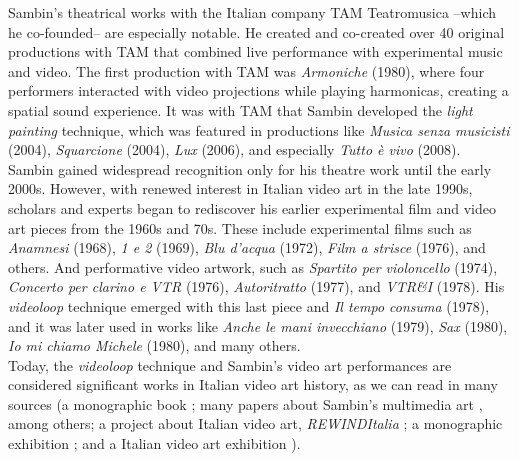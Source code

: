 Sambin’s theatrical works with the Italian company TAM Teatromusica –which he co-founded– are especially notable. He created and co-created over 40 original productions with TAM that combined live performance with experimental music and video. The first production with TAM was \textit{Armoniche} (1980), where four performers interacted with video projections while playing harmonicas, creating a spatial sound experience. It was with TAM that Sambin developed the \textit{light painting} technique, which was featured in productions like \textit{Musica senza musicisti} (2004), \textit{Squarcione} (2004), \textit{Lux} (2006), and especially \textit{Tutto è vivo} (2008).\\ 
Sambin gained widespread recognition only for his theatre work until the early 2000s. However, with renewed interest in Italian video art in the late 1990s, scholars and experts began to rediscover his earlier experimental film and video art pieces from the 1960s and 70s. These include experimental films such as \textit{Anamnesi} (1968), \textit{1 e 2} (1969), \textit{Blu d'acqua} (1972), \textit{Film a strisce} (1976), and others. And performative video artwork, such as \textit{Spartito per violoncello} (1974), \textit{Concerto per clarino e VTR} (1976), \textit{Autoritratto} (1977), and \textit{VTR\&I} (1978). His \textit{videoloop} technique emerged with this last piece and  \textit{Il tempo consuma} (1978), and it was later used in works like \textit{Anche le mani invecchiano} (1979), \textit{Sax} (1980), \textit{Io mi chiamo Michele} (1980), and many others.\\
Today, the \textit{videoloop} technique and Sambin’s video art performances are considered significant works in Italian video art history, as we can read in many sources (a monographic book \cite{lischi2014michele}; many papers about Sambin’s multimedia art \cite{leuzzi2019re, d2021invenzioni, gallo2021intimacy}, among others; a project about Italian video art, \textit{REWINDItalia} \cite{Leuzzi2015-bh}; a monographic exhibition \cite{dimarino2022silvana}; and a Italian video art exhibition \cite{saba2022videoarte}). 

